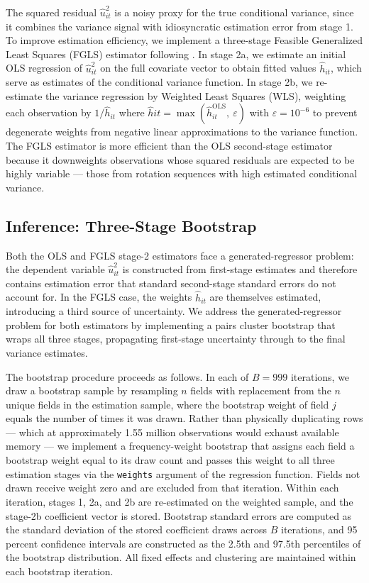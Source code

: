 \documentclass[11pt,letterpaper]{article}
\theoremstyle{remark}
\theoremstyle{plain}
\theoremstyle{definition}
\begin{document}
The squared residual $\hat{u}_{it}^2$ is a noisy proxy for the true conditional variance, since it combines the variance signal with idiosyncratic estimation error from stage 1. To improve estimation efficiency, we implement a three-stage Feasible Generalized Least Squares (FGLS) estimator following \cite{Harvey1976}. In stage 2a, we estimate an initial OLS regression of $\hat{u}_{it}^2$ on the full covariate vector to obtain fitted values $\hat{h}_{it}$, which serve as estimates of the conditional variance function. In stage 2b, we re-estimate the variance regression by Weighted Least Squares (WLS), weighting each observation by $1/\hat{h}_{it}$ where $\hat{h}{it}= \max(\hat{h}_{it}^{\text{OLS}},\ \varepsilon)$ with $\varepsilon = 10^{-6}$ to prevent degenerate weights from negative linear approximations to the variance function. The FGLS estimator is more efficient than the OLS second-stage estimator because it downweights observations whose squared residuals are expected to be highly variable — those from rotation sequences with high estimated conditional variance.

\subsection{\label{subsec:bootstrap}Inference: Three-Stage Bootstrap}

Both the OLS and FGLS stage-2 estimators face a generated-regressor problem: the dependent variable $\hat{u}_{it}^2$ is constructed from first-stage estimates and therefore contains estimation error that standard second-stage standard errors do not account for. In the FGLS case, the weights $\hat{h}_{it}$ are themselves estimated, introducing a third source of uncertainty. We address the generated-regressor problem for both estimators by implementing a pairs cluster bootstrap that wraps all three stages, propagating first-stage uncertainty through to the final variance estimates.

The bootstrap procedure proceeds as follows. In each of $B = 999$ iterations, we draw a bootstrap sample by resampling $n$ fields with replacement from the $n$ unique fields in the estimation sample, where the bootstrap weight of field $j$ equals the number of times it was drawn. Rather than physically duplicating rows — which at approximately 1.55 million observations would exhaust available memory — we implement a frequency-weight bootstrap that assigns each field a bootstrap weight equal to its draw count and passes this weight to all three estimation stages via the \texttt{weights} argument of the regression function. Fields not drawn receive weight zero and are excluded from that iteration. Within each iteration, stages 1, 2a, and 2b are re-estimated on the weighted sample, and the stage-2b coefficient vector is stored. Bootstrap standard errors are computed as the standard deviation of the stored coefficient draws across $B$ iterations, and 95 percent confidence intervals are constructed as the 2.5th and 97.5th percentiles of the bootstrap distribution. All fixed effects and clustering are maintained within each bootstrap iteration.
\end{document}
